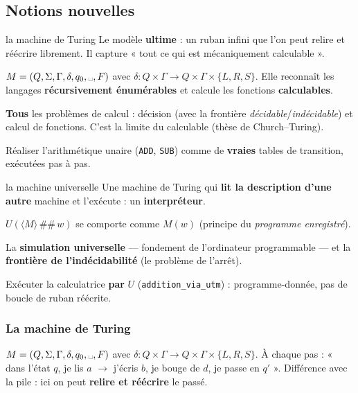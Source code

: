 \documentclass[11pt,a4paper]{scrartcl}
\begin{document}
\subsection{Notions nouvelles}
\begin{objetformel}{la machine de Turing}
 Le modèle \textbf{ultime} : un ruban infini que l'on peut relire et
réécrire librement. Il capture « tout ce qui est mécaniquement calculable ».

 $M=(Q,\Sigma,\Gamma,\delta,q_0,\text{\textvisiblespace},F)$ avec
$\delta:Q\times\Gamma\to Q\times\Gamma\times\{L,R,S\}$. Elle reconnaît les langages
\textbf{récursivement énumérables} et calcule les fonctions \textbf{calculables}.

 \textbf{Tous} les problèmes de calcul : décision (avec la
frontière \emph{décidable}/\emph{indécidable}) et calcul de fonctions. C'est la limite du
calculable (thèse de Church--Turing).

 Réaliser l'arithmétique unaire (\texttt{ADD}, \texttt{SUB}) comme de
\textbf{vraies} tables de transition, exécutées pas à pas.
\end{objetformel}

\begin{objetformel}{la machine universelle}
 Une machine de Turing qui \textbf{lit la description d'une autre} machine
et l'exécute : un \textbf{interpréteur}.

 $U(\langle M\rangle\,\#\#\,w)$ se comporte comme $M(w)$
(principe du \emph{programme enregistré}).

 La \textbf{simulation universelle} — fondement de l'ordinateur
programmable — et la \textbf{frontière de l'indécidabilité} (le problème de l'arrêt).

 Exécuter la calculatrice \textbf{par} $U$
(\texttt{addition\_via\_utm}) : programme-donnée, pas de boucle de ruban réécrite.
\end{objetformel}

\subsubsection{La machine de Turing}
$M=(Q,\Sigma,\Gamma,\delta,q_0,\text{\textvisiblespace},F)$ avec
$\delta:Q\times\Gamma\to Q\times\Gamma\times\{L,R,S\}$. À chaque pas : « dans l'état $q$, je
lis $a$ $\to$ j'écris $b$, je bouge de $d$, je passe en $q'$ ». Différence avec la pile : ici
on peut \textbf{relire et réécrire} le passé.
\begin{center}
\end{center}
\end{document}
